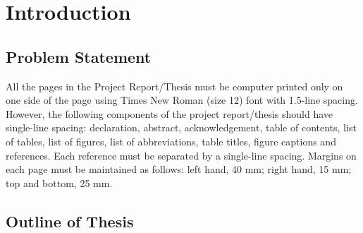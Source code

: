 \chapter{Introduction}  %

\section{Problem Statement} %

All the pages in the Project Report/Thesis must be computer printed only on one side of the page using
Times New Roman (size 12) font with 1.5-line spacing.
However, the following components of the project report/thesis should have single-line spacing: declaration, abstract, acknowledgement, table of contents, list of tables, list of figures, list of abbreviations, table titles, figure captions and references. 
Each reference must be separated by a single-line spacing. Margins on each page must be maintained as
follows: left hand, 40 mm; right hand, 15 mm; top and bottom, 25 mm.  

\citep{Streftaris2004} 
 
\section{Outline of Thesis}